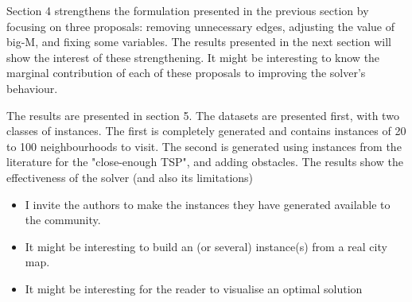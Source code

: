 \documentclass{article}
\newenvironment{reviewer}{\setcounter{pointcounter}{1}}{}
\newcommand{\point}{\text{{\selectfont \thepointcounter} \stepcounter{pointcounter}}}
\begin{document}
\begin{reviewer}
		\begin{tcolorbox}[breakable,enhanced,coltitle=black,colback=green!5!white,colframe=green!75!black,title=\textbf{Answer R2.\point},borderline={1pt}{0pt}{black},boxrule=0pt]
			
		\end{tcolorbox}
		
		\begin{itshape}
			Section 4 strengthens the formulation presented in the previous section by focusing on three proposals: removing unnecessary edges, adjusting the value of big-M, and fixing some variables. The results presented in the next section will show the interest of these strengthening. It might be interesting to know the marginal contribution of each of these proposals to improving the solver's behaviour.
		\end{itshape}
		
		\begin{tcolorbox}[breakable,enhanced,coltitle=black,colback=green!5!white,colframe=green!75!black,title=\textbf{Answer R2.\point},borderline={1pt}{0pt}{black},boxrule=0pt]
			
		\end{tcolorbox}
		
		\begin{itshape}
			The results are presented in section 5. The datasets are presented first, with two classes of instances. The first is completely generated and contains instances of 20 to 100 neighbourhoods to visit. The second is generated using instances from the literature for the "close-enough TSP", and adding obstacles. The results show the effectiveness of the solver (and also its limitations)
			\begin{itemize}
			\item I invite the authors to make the instances they have generated available to the community.
			\item It might be interesting to build an (or several) instance(s) from a real city map.
			\item It might be interesting for the reader to visualise an optimal solution
			\end{itemize}
		\end{itshape}
		
		\begin{tcolorbox}[breakable,enhanced,coltitle=black,colback=green!5!white,colframe=green!75!black,title=\textbf{Answer R2.\point},borderline={1pt}{0pt}{black},boxrule=0pt]
			
		\end{tcolorbox}
		

\end{reviewer}
\end{document}
